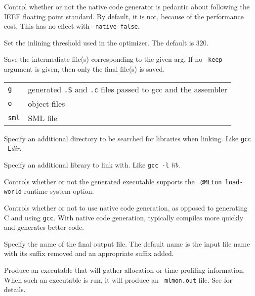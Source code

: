 \begin{description}
Control whether or not the native code generator is pedantic about following
the IEEE floating point standard.  By default, it is not, because of the
performance cost.  This has no effect with {\tt -native false}.


Set the inlining threshold used in the optimizer.  The default is 320.


Save the intermediate file(s) corresponding to the given arg.  If
no {\tt -keep} argument is given, then only the final file(s) is saved.\\
\begin{tabular}{ll}
{\tt g} & generated {\tt .S} and {\tt .c} files passed to gcc and the assembler\\
{\tt o} & object files\\
{\tt sml} & SML file\\
\end{tabular}

Specify an additional directory to be searched for libraries when
linking.  Like {\tt gcc -L}{\it dir}.

Specify an additional library to link with.  Like {\tt gcc -l}{\it
lib}.

Controls whether or not the generated executable supports the {\tt
@MLton load-world} runtime system option.

Controls whether or not to use native code generation, as opposed to
generating C and using {\tt gcc}.  With native code generation,
{\mlton} typically compiles more quickly and generates better code.

Specify the name of the final output file. The default name is the
input file name with its suffix removed and an appropriate suffix
added.

Produce an executable that will gather allocation or time profiling
information.  When such an executable is run, it will produce an {\tt
mlmon.out} file.  See  for details.


\end{description}
